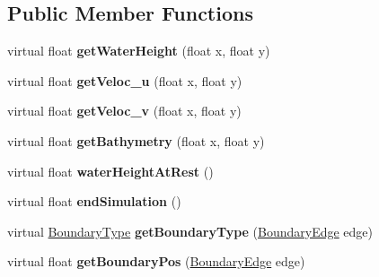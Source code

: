 \subsection*{Public Member Functions}
\begin{DoxyCompactItemize}
\item 
\hypertarget{classSWE__Scenario_ade6f356d60b1402c034611266462b88b}{virtual float {\bfseries get\-Water\-Height} (float x, float y)}\label{classSWE__Scenario_ade6f356d60b1402c034611266462b88b}

\item 
\hypertarget{classSWE__Scenario_ab1d5e360c861df3c8c0ccd919bd7f495}{virtual float {\bfseries get\-Veloc\-\_\-u} (float x, float y)}\label{classSWE__Scenario_ab1d5e360c861df3c8c0ccd919bd7f495}

\item 
\hypertarget{classSWE__Scenario_afeaf75872a1678ea64e6f7accd1e49c6}{virtual float {\bfseries get\-Veloc\-\_\-v} (float x, float y)}\label{classSWE__Scenario_afeaf75872a1678ea64e6f7accd1e49c6}

\item 
\hypertarget{classSWE__Scenario_afe09a1ba63304800651f25873570a348}{virtual float {\bfseries get\-Bathymetry} (float x, float y)}\label{classSWE__Scenario_afe09a1ba63304800651f25873570a348}

\item 
\hypertarget{classSWE__Scenario_a9de0f0f9fcc34dfe00c522b10c343d91}{virtual float {\bfseries water\-Height\-At\-Rest} ()}\label{classSWE__Scenario_a9de0f0f9fcc34dfe00c522b10c343d91}

\item 
\hypertarget{classSWE__Scenario_ae7ed72f584069e9885c33c4ca83f3ff5}{virtual float {\bfseries end\-Simulation} ()}\label{classSWE__Scenario_ae7ed72f584069e9885c33c4ca83f3ff5}

\item 
\hypertarget{classSWE__Scenario_ab8fe7ce15d7758fb0c4e0e3887b34a5d}{virtual \hyperlink{SWE__Scenario_8hh_af75d5dd7322fa39ed0af4e7839e600f8}{Boundary\-Type} {\bfseries get\-Boundary\-Type} (\hyperlink{SWE__Scenario_8hh_aa5e01e3f7df312f7b9b0d02521141fcc}{Boundary\-Edge} edge)}\label{classSWE__Scenario_ab8fe7ce15d7758fb0c4e0e3887b34a5d}

\item 
\hypertarget{classSWE__Scenario_a1b01e953c2079b64f527c9bc5a0c86d7}{virtual float {\bfseries get\-Boundary\-Pos} (\hyperlink{SWE__Scenario_8hh_aa5e01e3f7df312f7b9b0d02521141fcc}{Boundary\-Edge} edge)}\label{classSWE__Scenario_a1b01e953c2079b64f527c9bc5a0c86d7}

\end{DoxyCompactItemize}


